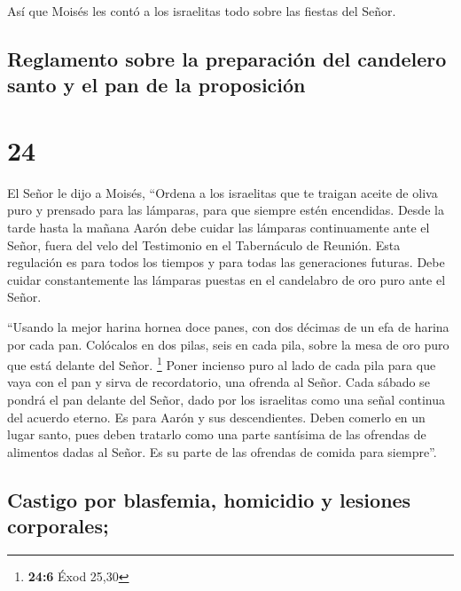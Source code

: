  Así que Moisés les contó a los israelitas todo sobre las
fiestas del Señor.

\hypertarget{reglamento-sobre-la-preparaciuxf3n-del-candelero-santo-y-el-pan-de-la-proposiciuxf3n}{%
\subsection{Reglamento sobre la preparación del candelero santo y el pan
de la
proposición}\label{reglamento-sobre-la-preparaciuxf3n-del-candelero-santo-y-el-pan-de-la-proposiciuxf3n}}

\hypertarget{section-23}{%
\section{24}\label{section-23}}

 El Señor le dijo a Moisés,  ``Ordena a los
israelitas que te traigan aceite de oliva puro y prensado para las
lámparas, para que siempre estén encendidas.  Desde la
tarde hasta la mañana Aarón debe cuidar las lámparas continuamente ante
el Señor, fuera del velo del Testimonio en el Tabernáculo de Reunión.
Esta regulación es para todos los tiempos y para todas las generaciones
futuras.  Debe cuidar constantemente las lámparas puestas
en el candelabro de oro puro ante el Señor.

 ``Usando la mejor harina hornea doce panes, con dos
décimas de un efa de harina por cada pan.  Colócalos en
dos pilas, seis en cada pila, sobre la mesa de oro puro que está delante
del Señor. \footnote{\textbf{24:6} Éxod 25,30}  Poner
incienso puro al lado de cada pila para que vaya con el pan y sirva de
recordatorio, una ofrenda al Señor.  Cada sábado se pondrá
el pan delante del Señor, dado por los israelitas como una señal
continua del acuerdo eterno.  Es para Aarón y sus
descendientes. Deben comerlo en un lugar santo, pues deben tratarlo como
una parte santísima de las ofrendas de alimentos dadas al Señor. Es su
parte de las ofrendas de comida para siempre''.

\hypertarget{castigo-por-blasfemia-homicidio-y-lesiones-corporales}{%
\subsection{Castigo por blasfemia, homicidio y lesiones
corporales;}\label{castigo-por-blasfemia-homicidio-y-lesiones-corporales}}

